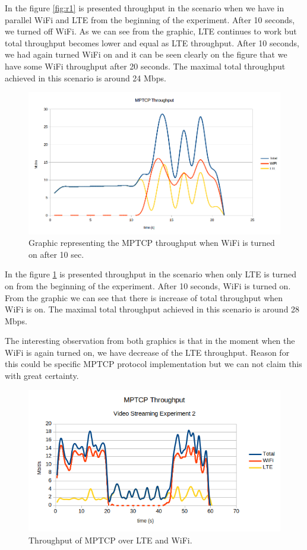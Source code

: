 \documentclass{llncs}
\begin{document}
In the figure \ref{fig:r1} is presented throughput in the scenario when we have in parallel WiFi and LTE from the beginning of the experiment. After 10 seconds, we turned off WiFi. As we can see from the graphic, LTE continues to work but total throughput becomes lower and equal as LTE throughput. After 10 seconds, we had again turned WiFi on and it can be seen clearly on the figure that we have some WiFi throughput after 20 seconds. The maximal total throughput achieved in this scenario is around 24 Mbps.

\begin{figure}[H]
\centering
\includegraphics[width=1.0\textwidth]{result2.png}
\caption{\label{fig:r2} Graphic representing the MPTCP throughput when WiFi is turned on after 10 sec.}
\end{figure}

In the figure \ref{fig:r2} is presented throughput in the scenario when only LTE is turned on from the beginning of the experiment. After 10 seconds, WiFi is turned on. From the graphic we can see that there is increase of total throughput when WiFi is on. The maximal total throughput achieved in this scenario is around 28 Mbps.

The interesting observation from both graphics is that in the moment when the WiFi is again turned on, we have decrease of the LTE throughput. Reason for this could be specific MPTCP protocol implementation but we can not claim this with great certainty.
 
\begin{figure}[H]
\centering
\includegraphics[scale=0.8]{videotest2.png}
\caption{\label{fig:videotest2} Throughput of MPTCP over LTE and WiFi.}
\end{figure} 
 
\end{document}
